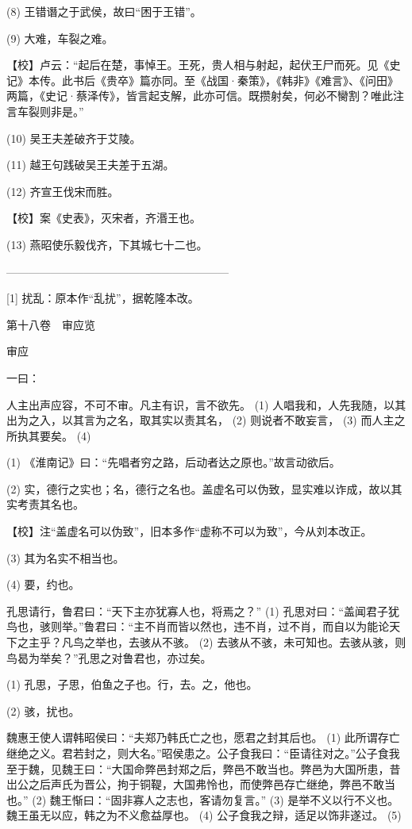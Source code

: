 \documentclass[12pt,UTF8]{ctexbook}
\begin{document}
(8) 王错谮之于武侯，故曰“困于王错”。

(9) 大难，车裂之难。

【校】卢云：“起后在楚，事悼王。王死，贵人相与射起，起伏王尸而死。见《史记》本传。此书后《贵卒》篇亦同。至《战国·秦策》，《韩非》《难言》、《问田》两篇，《史记·蔡泽传》，皆言起支解，此亦可信。既攒射矣，何必不臠割？唯此注言车裂则非是。”

(10) 吴王夫差破齐于艾陵。

(11) 越王句践破吴王夫差于五湖。

(12) 齐宣王伐宋而胜。

【校】案《史表》，灭宋者，齐湣王也。

(13) 燕昭使乐毅伐齐，下其城七十二也。




————————————————————

[1] 扰乱：原本作“乱扰”，据乾隆本改。





第十八卷　审应览



审应


一曰：

人主出声应容，不可不审。凡主有识，言不欲先。 (1) 人唱我和，人先我随，以其出为之入，以其言为之名，取其实以责其名， (2) 则说者不敢妄言， (3) 而人主之所执其要矣。 (4)

(1) 《淮南记》曰：“先唱者穷之路，后动者达之原也。”故言动欲后。

(2) 实，德行之实也；名，德行之名也。盖虚名可以伪致，显实难以诈成，故以其实考责其名也。

【校】注“盖虚名可以伪致”，旧本多作“虚称不可以为致”，今从刘本改正。

(3) 其为名实不相当也。

(4) 要，约也。

孔思请行，鲁君曰：“天下主亦犹寡人也，将焉之？” (1) 孔思对曰：“盖闻君子犹鸟也，骇则举。”鲁君曰：“主不肖而皆以然也，违不肖，过不肖，而自以为能论天下之主乎？凡鸟之举也，去骇从不骇。 (2) 去骇从不骇，未可知也。去骇从骇，则鸟曷为举矣？”孔思之对鲁君也，亦过矣。

(1) 孔思，子思，伯鱼之子也。行，去。之，他也。

(2) 骇，扰也。

魏惠王使人谓韩昭侯曰：“夫郑乃韩氏亡之也，愿君之封其后也。 (1) 此所谓存亡继绝之义。君若封之，则大名。”昭侯患之。公子食我曰：“臣请往对之。”公子食我至于魏，见魏王曰：“大国命弊邑封郑之后，弊邑不敢当也。弊邑为大国所患，昔岀公之后声氏为晋公，拘于铜鞮，大国弗怜也，而使弊邑存亡继绝，弊邑不敢当也。” (2) 魏王惭曰：“固非寡人之志也，客请勿复言。” (3) 是举不义以行不义也。魏王虽无以应，韩之为不义愈益厚也。 (4) 公子食我之辩，适足以饰非遂过。 (5)
\end{document}
